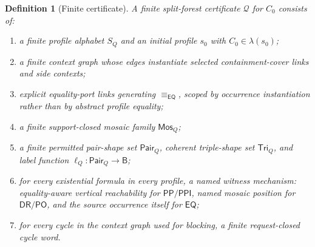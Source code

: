 \documentclass[11pt]{article}
\newtheorem{definition}[theorem]{Definition}
\newcommand{\Base}{\mathsf B}
\newcommand{\EQ}{\mathsf{EQ}}
\newcommand{\PP}{\mathsf{PP}}
\newcommand{\PPI}{\mathsf{PPI}}
\newcommand{\PO}{\mathsf{PO}}
\newcommand{\DR}{\mathsf{DR}}
\newcommand{\Q}{\mathcal Q}
\newcommand{\Mos}{\mathsf{Mos}}
\newcommand{\eqc}{\equiv_{\EQ}}
\newcommand{\Pair}{\mathsf{Pair}}
\newcommand{\Tri}{\mathsf{Tri}}
\begin{document}
\begin{definition}[Finite certificate]\label{def:cert}
A finite split-forest certificate \(\Q\) for \(C_0\) consists of:
\begin{enumerate}[label=(C\arabic*)]
\item a finite profile alphabet \(S_Q\) and an initial profile \(s_0\) with \(C_0\in\lambda(s_0)\);
\item a finite context graph whose edges instantiate selected containment-cover links and side contexts;
\item explicit equality-port links generating \(\eqc\), scoped by occurrence instantiation rather than by abstract profile equality;
\item a finite support-closed mosaic family \(\Mos_Q\);
\item a finite permitted pair-shape set \(\Pair_Q\), coherent triple-shape set \(\Tri_Q\), and label function \(\ell_Q:\Pair_Q\to\Base\);
\item for every existential formula in every profile, a named witness mechanism: equality-aware vertical reachability for \(\PP/\PPI\), named mosaic position for \(\DR/\PO\), and the source occurrence itself for \(\EQ\);
\item for every cycle in the context graph used for blocking, a finite request-closed cycle word.
\end{enumerate}
\end{definition}
\end{document}
